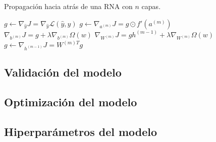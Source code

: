 \begin{algorithm}[H]
	\caption{Propagación hacia atrás de una RNA con $n$ capas.}
	\label{alg:backpropagation}
		\begin{algorithmic}
		\State $g \gets \nabla_{\hat{y}} J = \nabla_{\hat{y}} \mathcal{L}(\hat{y}, y)$ 
		\State $g \gets \nabla_{a^{(m)}} J = g \odot f'(a^{(m)})$ 
		\State $\nabla_{b^{(m)}} J = g + \lambda \nabla_{b^{(m)}} \Omega(w)$ 
		\State $\nabla_{W^{(m)}} J = g h^{(m-1)} + \lambda \nabla_{W^{(m)}} \Omega(w)$ 
		\State $g \gets \nabla_{h^{(m-1)}} J = W^{(m)T}g$ 
		\EndFor
	\end{algorithmic}
\end{algorithm}
\subsection{Validación del modelo}

\subsection{Optimización del modelo}

\subsection{Hiperparámetros del modelo}

